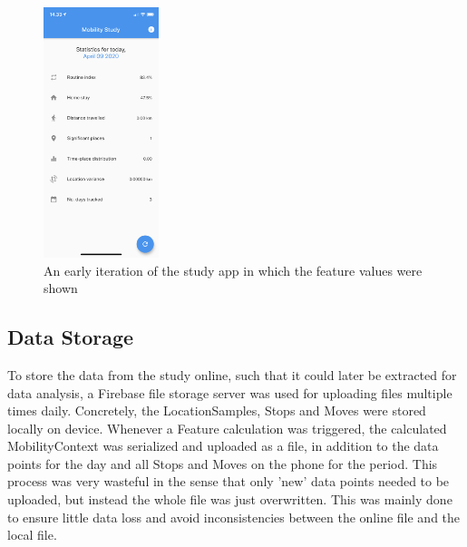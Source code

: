 \begin{figure}
    \centering
    \includegraphics[width=0.3\textwidth]{images/app_imgs/app-features.png}
    \caption{An early iteration of the study app in which the feature values were shown}
    \label{fig:app-features-screen}
\end{figure}
\subsection{Data Storage}
To store the data from the study online, such that it could later be extracted for data analysis, a Firebase file storage server was used for uploading files multiple times daily. Concretely, the LocationSamples, Stops and Moves were stored locally on device. Whenever a Feature calculation was triggered, the calculated MobilityContext was serialized and uploaded as a file, in addition to the data points for the day and all Stops and Moves on the phone for the period. This process was very wasteful in the sense that only 'new' data points needed to be uploaded, but instead the whole file was just overwritten. This was mainly done to ensure little data loss and avoid inconsistencies between the online file and the local file.